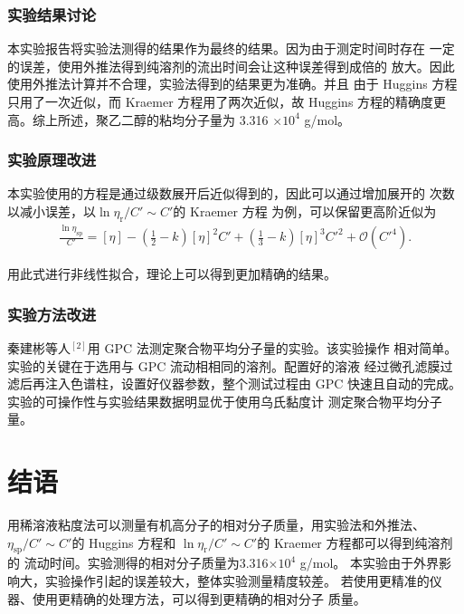 \documentclass[12pt]{ctexart}
\numberwithin{equation}{section}
\begin{document}
\subsubsection{实验结果讨论}

本实验报告将实验法测得的结果作为最终的结果。因为由于测定时间时存在
一定的误差，使用外推法得到纯溶剂的流出时间会让这种误差得到成倍的
放大。因此使用外推法计算并不合理，实验法得到的结果更为准确。并且
由于 Huggins 方程只用了一次近似，而 Kraemer 方程用了两次近似，故
Huggins 方程的精确度更高。综上所述，聚乙二醇的粘均分子量为 3.316
$\times 10^4$ g/mol。

\subsubsection{实验原理改进}

本实验使用的方程是通过级数展开后近似得到的，因此可以通过增加展开的
次数以减小误差，以$\ln\eta_\text{r}/C'\sim C'$的 Kraemer 方程
为例，可以保留更高阶近似为
\begin{align}
    \frac{\ln\eta_\text{sp}}{C'}
    = [\eta] - \left(\frac{1}{2} - k\right)[\eta]^2 C'
    + \left(\frac{1}{3} - k\right)[\eta]^3 C'^2
    + \mathcal{O}(C'^4).
\end{align}

用此式进行非线性拟合，理论上可以得到更加精确的结果。

\subsubsection{实验方法改进}

秦建彬等人$^{[2]}$用 GPC 法测定聚合物平均分子量的实验。该实验操作
相对简单。实验的关键在于选用与 GPC 流动相相同的溶剂。配置好的溶液
经过微孔滤膜过滤后再注入色谱柱，设置好仪器参数，整个测试过程由 GPC
快速且自动的完成。实验的可操作性与实验结果数据明显优于使用乌氏黏度计
测定聚合物平均分子量。

\section{结语}

用稀溶液粘度法可以测量有机高分子的相对分子质量，用实验法和外推法、
$\eta_{\text{sp}}/C'\sim C'$的 Huggins 方程和
$\ln\eta_\text{r}/C'\sim C'$的 Kraemer 方程都可以得到纯溶剂的
流动时间。实验测得的相对分子质量为3.316$\times 10^4$ g/mol。
本实验由于外界影响大，实验操作引起的误差较大，整体实验测量精度较差。
若使用更精准的仪器、使用更精确的处理方法，可以得到更精确的相对分子
质量。
\end{document}
